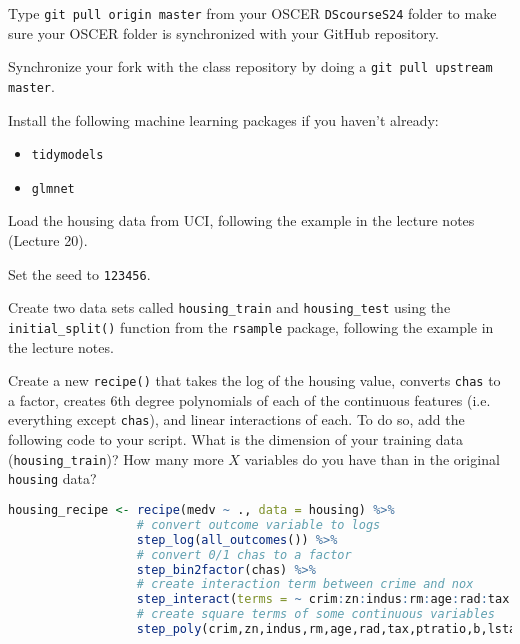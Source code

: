 \documentclass[12pt,english]{exam}
\begin{document}
\begin{questions}
\question Type \texttt{git pull origin master} from your OSCER \texttt{DScourseS24} folder to make sure your OSCER folder is synchronized with your GitHub repository. 

\question Synchronize your fork with the class repository by doing a \texttt{git pull upstream master}.

\question Install the following machine learning packages if you haven't already:
\begin{itemize}
    \item \texttt{tidymodels}
    \item \texttt{glmnet}
\end{itemize}

\question Load the housing data from UCI, following the example in the lecture notes (Lecture 20).

\question Set the seed to \texttt{123456}.

\question Create two data sets called \texttt{housing\_train} and \texttt{housing\_test} using the \texttt{initial\_split()} function from the \texttt{rsample} package, following the example in the lecture notes.

\question Create a new \texttt{recipe()} that takes the log of the housing value, converts \texttt{chas} to a factor, creates 6th degree polynomials of each of the continuous features (i.e. everything except \texttt{chas}), and linear interactions of each. To do so, add the following code to your script. What is the dimension of your training data (\texttt{housing\_train})? How many more $X$ variables do you have than in the original \texttt{housing} data?
\begin{lstlisting}[language=R]
housing_recipe <- recipe(medv ~ ., data = housing) %>%
                  # convert outcome variable to logs
                  step_log(all_outcomes()) %>%
                  # convert 0/1 chas to a factor
                  step_bin2factor(chas) %>%
                  # create interaction term between crime and nox
                  step_interact(terms = ~ crim:zn:indus:rm:age:rad:tax:ptratio:b:lstat:dis:nox) %>%
                  # create square terms of some continuous variables
                  step_poly(crim,zn,indus,rm,age,rad,tax,ptratio,b,lstat,dis,nox, degree=6)


\end{lstlisting}
\end{questions}
\end{document}

